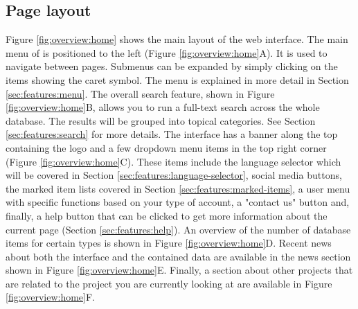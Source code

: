 \subsection{Page layout}
Figure \ref{fig:overview:home} shows the main layout of the {\germinate} web interface. The main menu of {\germinate} is positioned to the left (Figure \ref{fig:overview:home}A). It is used to navigate between pages. Submenus can be expanded by simply clicking on the items showing the caret symbol. The menu is explained in more detail in Section \ref{sec:features:menu}. The overall search feature, shown in Figure \ref{fig:overview:home}B, allows you to run a full-text search across the whole database. The results will be grouped into topical categories. See Section \ref{sec:features:search} for more details. The interface has a banner along the top containing the {\germinate} logo and a few dropdown menu items in the top right corner (\cf Figure \ref{fig:overview:home}C). These items include the language selector which will be covered in Section \ref{sec:features:language-selector}, social media buttons, the marked item lists covered in Section \ref{sec:features:marked-items}, a user menu with specific functions based on your type of account, a "contact us" button and, finally, a help button that can be clicked to get more information about the current page (\cf Section \ref{sec:features:help}). An overview of the number of database items for certain types is shown in Figure \ref{fig:overview:home}D. Recent news about both the {\germinate} interface and the contained data are available in the news section shown in Figure \ref{fig:overview:home}E. Finally, a section about other projects that are related to the project you are currently looking at are available in Figure \ref{fig:overview:home}F.

